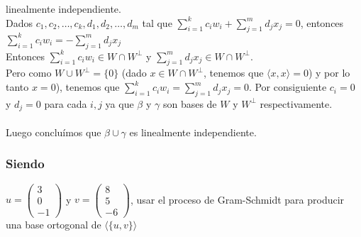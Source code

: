 \documentclass{article}
\begin{document}
\begin{enumerate}[a.]
	linealmente independiente. \\
	Dados $c_1,c_2,\dots,c_k,d_1,d_2,\dots,d_m$ tal que
	$\displaystyle \sum_{i=1}^{k}{c_iw_i} + \sum_{j=1}^{m}{d_jx_j} = 0$, entonces 
	$\displaystyle \sum_{i=1}^{k}{c_iw_i} = - \sum_{j=1}^{m}{d_jx_j}$ \\
	Entonces $\displaystyle \sum_{i=1}^{k}{c_iw_i} \in W \cap W^\bot$ y 
	$\displaystyle \sum_{j=1}^{m}{d_jx_j} \in W \cap W^\bot$. \\
	Pero como $W \cup W^\bot = \{ 0\}$ (dado $x \in W \cap W^\bot$, tenemos que $\langle x,x \rangle = 0$)
	y por lo tanto $x = 0$), tenemos que $\displaystyle \sum_{i=1}^{k}{c_iw_i} = \sum_{j=1}^{m}{d_jx_j} = 0$.
	Por consiguiente $c_i = 0$ y $d_j = 0$ para cada $i,j$ ya que $\beta$ y $\gamma$ son bases de $W$
	y $W^\bot$ respectivamente. \\ \\
	Luego concluímos que $\beta \cup \gamma$ es linealmente independiente.
\end{enumerate}

\subsubsection{Siendo}
$u = \begin{pmatrix}3\\0\\-1\end{pmatrix}$ y $v = \begin{pmatrix}8\\5\\-6\end{pmatrix}$, usar el proceso de
Gram-Schmidt para producir una base ortogonal de $\langle \{ u,v \} \rangle$
\end{document}
